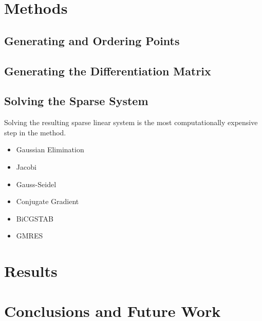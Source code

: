 \documentclass[12pt]{article}
\begin{document}
\section{Methods}

\subsection{Generating and Ordering Points}

\subsection{Generating the Differentiation Matrix}

\subsection{Solving the Sparse System}

	Solving the resulting sparse linear system is the most computationally expensive step in the method. 

	\begin{itemize}
		\item Gaussian Elimination
		\item Jacobi
		\item Gauss-Seidel
		\item Conjugate Gradient
		\item BiCGSTAB
		\item GMRES
	\end{itemize}

\section{Results}

\section{Conclusions and Future Work}

 
\pagebreak
 
\printbibliography
\end{document}
